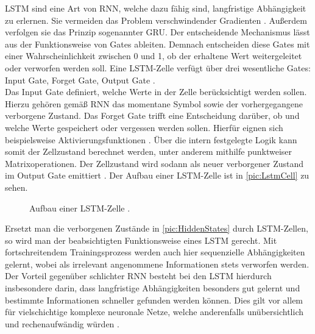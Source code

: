 \noindent
\ac{LSTM} sind eine Art von \ac{RNN}, welche dazu fähig sind, langfristige Abhängigkeit zu erlernen. Sie vermeiden das Problem verschwindender Gradienten \cite{AIU19}. Außerdem verfolgen sie das Prinzip sogenannter \ac{GRU}. Der entscheidende Mechanismus lässt aus der Funktionsweise von Gates ableiten. Demnach entscheiden diese Gates mit einer Wahrscheinlichkeit zwischen 0 und 1, ob der erhaltene Wert weitergeleitet oder verworfen werden soll. Eine \ac{LSTM}-Zelle verfügt über drei wesentliche Gates: Input Gate, Forget Gate, Output Gate \cite[S.~347-348]{ZHA20}.\\

\noindent
Das Input Gate definiert, welche Werte in der Zelle berücksichtigt werden sollen. Hierzu gehören gemäß \ac{RNN} das momentane Symbol sowie der vorhergegangene verborgene Zustand. Das Forget Gate trifft eine Entscheidung darüber, ob und welche Werte gespeichert oder vergessen werden sollen. Hierfür eignen sich beispielsweise Aktivierungsfunktionen \cite[S.~355]{ZHA20}. Über die intern festgelegte Logik kann somit der Zellzustand berechnet werden, unter anderem mithilfe punktweiser Matrixoperationen. Der Zellzustand wird sodann als neuer verborgener Zustand im Output Gate emittiert \cite{LUB18}. Der Aufbau einer \ac{LSTM}-Zelle ist in \autoref{pic:LstmCell} zu sehen.
\newpage

\begin{figure}[h!]
  \centering
  \caption{Aufbau einer LSTM-Zelle \cite[S.~357]{ZHA20}.}
  \label{pic:LstmCell}
\end{figure}

\noindent
Ersetzt man die verborgenen Zustände in \autoref{pic:HiddenStates} durch \ac{LSTM}-Zellen, so wird man der beabsichtigten Funktionsweise eines \ac{LSTM} gerecht. Mit fortschreitendem Trainingsprozess werden auch hier sequenzielle Abhängigkeiten gelernt, wobei als irrelevant angenommene Informationen stets verworfen werden. Der Vorteil gegenüber schlichter \ac{RNN} besteht bei den \ac{LSTM} hierdurch insbesondere darin, dass langfristige Abhängigkeiten besonders gut gelernt und bestimmte Informationen schneller gefunden werden können. Dies gilt vor allem für vielschichtige komplexe neuronale Netze, welche anderenfalls unübersichtlich und rechenaufwändig würden \cite{LUB18}.\\

